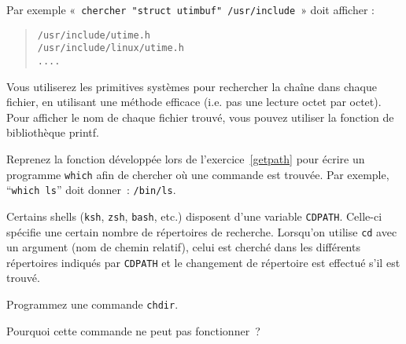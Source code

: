 Par exemple «~\verb|chercher "struct utimbuf" /usr/include|~»
doit afficher :

\begin {quote}
\begin {verbatim}
/usr/include/utime.h
/usr/include/linux/utime.h
....
\end{verbatim}
\end {quote}

Vous utiliserez les primitives systèmes pour rechercher la chaîne dans
chaque fichier, en utilisant une méthode efficace (i.e. pas une lecture
octet par octet). Pour afficher le nom de chaque fichier trouvé, vous
pouvez utiliser la fonction de bibliothèque printf.

\question

Reprenez la fonction développée lors de l'exercice~\ref {getpath} pour écrire
un programme {\tt which} afin de chercher où une commande est trouvée.
Par exemple, ``{\tt which~ls}'' doit donner~: {\tt /bin/ls}.


\question

Certains shells (\texttt {ksh}, \texttt {zsh}, {\tt bash}, etc.)
disposent d'une variable \texttt {CDPATH}.  Celle-ci
spécifie une certain nombre de répertoires de recherche.  Lorsqu'on
utilise {\tt cd} avec un argument (nom de chemin relatif), celui est
cherché dans les différents répertoires indiqués par {\tt CDPATH} et le
changement de répertoire est effectué s'il est trouvé.

Programmez une commande {\tt chdir}.

Pourquoi cette commande ne peut pas fonctionner~?


